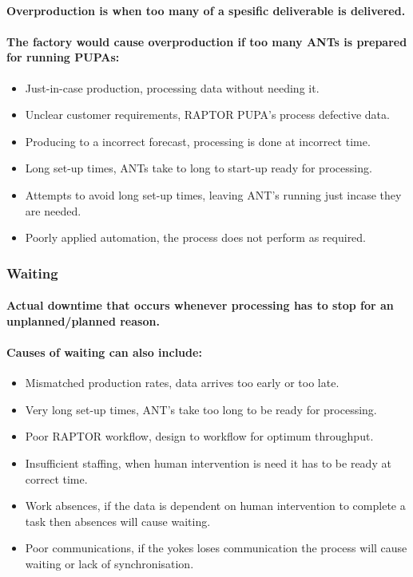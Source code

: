 \documentclass{acm_proc_article-sp}
\begin{document}
\paragraph{Overproduction is when too many of a spesific deliverable is delivered.}
\paragraph{The factory would cause overproduction if too many ANTs is prepared for running PUPAs:}
\begin{itemize}
\item Just-in-case production, processing data without needing it.
\item Unclear customer requirements, RAPTOR PUPA's process defective data.
\item Producing to a incorrect forecast, processing is done at incorrect time.
\item Long set-up times, ANTs take to long to start-up ready for processing.
\item Attempts to avoid long set-up times, leaving ANT's running just incase they are needed.
\item Poorly applied automation, the process does not perform as required. 
\end{itemize}
\subsubsection{Waiting}
\paragraph{Actual downtime that occurs whenever processing has to stop for an unplanned/planned reason.}
\paragraph{Causes of waiting can also include:}
\begin{itemize}
\item Mismatched production rates, data arrives too early or too late.
\item Very long set-up times, ANT's take too long to be ready for processing.
\item Poor RAPTOR workflow, design to workflow for optimum throughput.
\item Insufficient staffing, when human intervention is need it has to be ready at correct time.
\item Work absences, if the data is dependent on human intervention to complete a task then absences will cause waiting.
\item Poor communications, if the yokes loses communication the process will cause waiting or lack of synchronisation.
\end{itemize}
\end{document}
